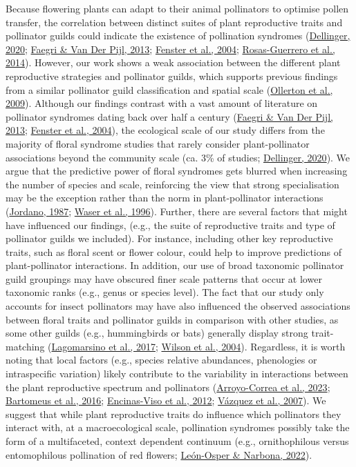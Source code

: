 \documentclass[
  12pt,
  a4paper,
]{article}
\begin{document}
Because flowering plants can adapt to their animal pollinators to optimise pollen transfer, the correlation between distinct suites of plant reproductive traits and pollinator guilds could indicate the existence of pollination syndromes (\protect\hyperlink{ref-dellinger2020}{Dellinger, 2020}; \protect\hyperlink{ref-faegri2013}{Faegri \& Van Der Pijl, 2013}; \protect\hyperlink{ref-fenster2004}{Fenster et al., 2004}; \protect\hyperlink{ref-rosas2014}{Rosas-Guerrero et al., 2014}). However, our work shows a weak association between the different plant reproductive strategies and pollinator guilds, which supports previous findings from a similar pollinator guild classification and spatial scale (\protect\hyperlink{ref-ollerton2009}{Ollerton et al., 2009}). Although our findings contrast with a vast amount of literature on pollinator syndromes dating back over half a century (\protect\hyperlink{ref-faegri2013}{Faegri \& Van Der Pijl, 2013}; \protect\hyperlink{ref-fenster2004}{Fenster et al., 2004}), the ecological scale of our study differs from the majority of floral syndrome studies that rarely consider plant-pollinator associations beyond the community scale (ca. 3\% of studies; \protect\hyperlink{ref-dellinger2020}{Dellinger, 2020}). We argue that the predictive power of floral syndromes gets blurred when increasing the number of species and scale, reinforcing the view that strong specialisation may be the exception rather than the norm in plant-pollinator interactions (\protect\hyperlink{ref-jordano1987}{Jordano, 1987}; \protect\hyperlink{ref-waser1996}{Waser et al., 1996}). Further, there are several factors that might have influenced our findings, (e.g., the suite of reproductive traits and type of pollinator guilds we included). For instance, including other key reproductive traits, such as floral scent or flower colour, could help to improve predictions of plant-pollinator interactions. In addition, our use of broad taxonomic pollinator guild groupings may have obscured finer scale patterns that occur at lower taxonomic ranks (e.g., genus or species level). The fact that our study only accounts for insect pollinators may have also influenced the observed associations between floral traits and pollinator guilds in comparison with other studies, as some other guilds (e.g., hummingbirds or bats) generally display strong trait-matching (\protect\hyperlink{ref-lagomarsino2017}{Lagomarsino et al., 2017}; \protect\hyperlink{ref-wilson2004}{Wilson et al., 2004}). Regardless, it is worth noting that local factors (e.g., species relative abundances, phenologies or intraspecific variation) likely contribute to the variability in interactions between the plant reproductive spectrum and pollinators (\protect\hyperlink{ref-arroyo2023}{Arroyo-Correa et al., 2023}; \protect\hyperlink{ref-bartomeus2016}{Bartomeus et al., 2016}; \protect\hyperlink{ref-encinas2012}{Encinas-Viso et al., 2012}; \protect\hyperlink{ref-vazquez2007}{Vázquez et al., 2007}). We suggest that while plant reproductive traits do influence which pollinators they interact with, at a macroecological scale, pollination syndromes possibly take the form of a multifaceted, context dependent continuum (e.g., ornithophilous versus entomophilous pollination of red flowers; \protect\hyperlink{ref-leon2022}{León-Osper \& Narbona, 2022}).
\end{document}
